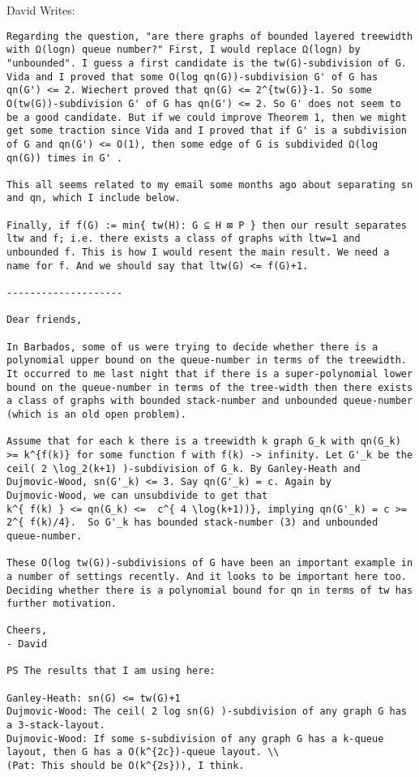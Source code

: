 \documentclass[kpfonts]{patmorin}
\begin{document}
\noindent David Writes:
\begin{verbatim}
Regarding the question, "are there graphs of bounded layered treewidth
with Ω(logn) queue number?" First, I would replace Ω(logn) by
"unbounded". I guess a first candidate is the tw(G)-subdivision of G.
Vida and I proved that some O(log qn(G))-subdivision G' of G has
qn(G') <= 2. Wiechert proved that qn(G) <= 2^{tw(G)}-1. So some
O(tw(G))-subdivision G' of G has qn(G') <= 2. So G' does not seem to
be a good candidate. But if we could improve Theorem 1, then we might
get some traction since Vida and I proved that if G' is a subdivision
of G and qn(G') <= O(1), then some edge of G is subdivided Ω(log
qn(G)) times in G' .

This all seems related to my email some months ago about separating sn
and qn, which I include below.

Finally, if f(G) := min{ tw(H): G ⊆ H ⊠ P } then our result separates
ltw and f; i.e. there exists a class of graphs with ltw=1 and
unbounded f. This is how I would resent the main result. We need a
name for f. And we should say that ltw(G) <= f(G)+1.

--------------------

Dear friends,

In Barbados, some of us were trying to decide whether there is a
polynomial upper bound on the queue-number in terms of the treewidth.
It occurred to me last night that if there is a super-polynomial lower
bound on the queue-number in terms of the tree-width then there exists
a class of graphs with bounded stack-number and unbounded queue-number
(which is an old open problem).

Assume that for each k there is a treewidth k graph G_k with qn(G_k)
>= k^{f(k)} for some function f with f(k) -> infinity. Let G'_k be the
ceil( 2 \log_2(k+1) )-subdivision of G_k. By Ganley-Heath and
Dujmovic-Wood, sn(G'_k) <= 3. Say qn(G'_k) = c. Again by
Dujmovic-Wood, we can unsubdivide to get that
k^{ f(k) } <= qn(G_k) <=  c^{ 4 \log(k+1))}, implying qn(G'_k) = c >=
2^{ f(k)/4}.  So G'_k has bounded stack-number (3) and unbounded
queue-number.

These O(log tw(G))-subdivisions of G have been an important example in
a number of settings recently. And it looks to be important here too.
Deciding whether there is a polynomial bound for qn in terms of tw has
further motivation.

Cheers,
- David

PS The results that I am using here:

Ganley-Heath: sn(G) <= tw(G)+1
Dujmovic-Wood: The ceil( 2 log sn(G) )-subdivision of any graph G has
a 3-stack-layout.
Dujmovic-Wood: If some s-subdivision of any graph G has a k-queue
layout, then G has a O(k^{2c})-queue layout. \\
(Pat: This should be O(k^{2s})), I think.
\end{verbatim}



\end{document}
